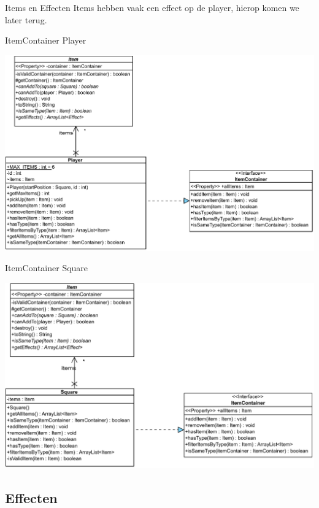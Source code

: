 \documentclass[11pt,t]{beamer}
\begin{document}
\begin{frame}{Items en Effecten}
\vspace{1.5in}
Items hebben vaak een effect op de player, hierop komen we later terug.
\end{frame}

\begin{frame}{ItemContainer}
Player
\begin{center}
\includegraphics[width=0.85\linewidth]{images/playeritemcontainer}
\end{center}
\end{frame}

\begin{frame}{ItemContainer}
Square
\begin{center}
\includegraphics[width=0.85\linewidth]{images/squareitemcontainer}
\end{center}
\end{frame}

\subsection{Effecten}
\end{document}
